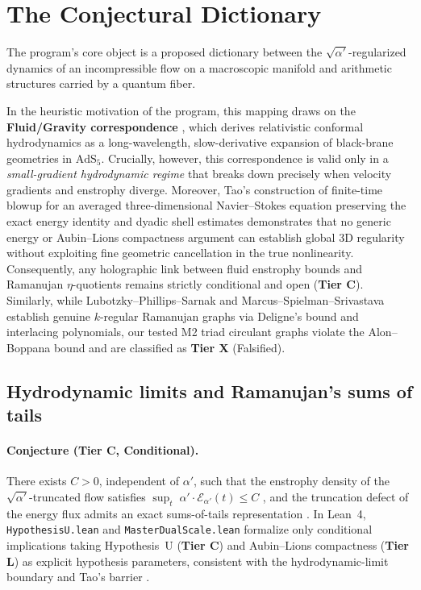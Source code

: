 \documentclass[11pt,a4paper]{article}
\theoremstyle{plain}
\theoremstyle{definition}
\theoremstyle{remark}
\newcommand{\tierL}{\textbf{Tier L}}
\newcommand{\tierC}{\textbf{Tier C}}
\newcommand{\tierX}{\textbf{Tier X}}
\begin{document}
\section{The Conjectural Dictionary}\label{sec:dictionary}
The program's core object is a proposed dictionary between the $\sqrt{\alpha'}$-regularized dynamics of an incompressible flow on a macroscopic manifold and arithmetic structures carried by a quantum fiber.

In the heuristic motivation of the program, this mapping draws on the \textbf{Fluid/Gravity correspondence} \cite{BHMR2008, Rangamani2009}, which derives relativistic conformal hydrodynamics as a long-wavelength, slow-derivative expansion of black-brane geometries in $\mathrm{AdS}_5$. Crucially, however, this correspondence is valid only in a \emph{small-gradient hydrodynamic regime} that breaks down precisely when velocity gradients and enstrophy diverge. Moreover, Tao's construction of finite-time blowup for an averaged three-dimensional Navier--Stokes equation preserving the exact energy identity and dyadic shell estimates \cite{Tao2016} demonstrates that no generic energy or Aubin--Lions compactness argument can establish global 3D regularity without exploiting fine geometric cancellation in the true nonlinearity. Consequently, any holographic link between fluid enstrophy bounds and Ramanujan $\eta$-quotients remains strictly conditional and open (\tierC{}). Similarly, while Lubotzky--Phillips--Sarnak \cite{LPS1988} and Marcus--Spielman--Srivastava \cite{MSS2015} establish genuine $k$-regular Ramanujan graphs via Deligne's bound \cite{Deligne1974} and interlacing polynomials, our tested M2 triad circulant graphs violate the Alon--Boppana bound and are classified as \tierX{} (Falsified).

\subsection{Hydrodynamic limits and Ramanujan's sums of tails}
\paragraph{Conjecture (\tierC{}, Conditional).}
There exists $C>0$, independent of $\alpha'$, such that the enstrophy
density of the $\sqrt{\alpha'}$-truncated flow satisfies
$\sup_{t}\;\alpha'\!\cdot\!\mathcal{E}_{\alpha'}(t)\le C$ \cite{BKM1984, CKN1982, CF1993, CFM1996}, and the truncation defect of the energy flux
admits an exact sums-of-tails representation \cite{AJO2001, BowmanMcLaughlin2004}. In Lean~4, \texttt{HypothesisU.lean} and \texttt{MasterDualScale.lean} formalize only conditional implications taking Hypothesis~U (\tierC{}) and Aubin--Lions compactness (\tierL{}) as explicit hypothesis parameters, consistent with the hydrodynamic-limit boundary \cite{BHMR2008, Rangamani2009} and Tao's barrier \cite{Tao2016}.
\end{document}
